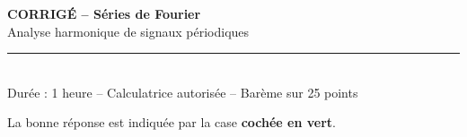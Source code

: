 \documentclass[a4paper,11pt]{article}
\begin{document}
\begin{center}
  {\LARGE \textbf{\textcolor{red!70!black}{CORRIGÉ} -- Séries de Fourier}} \\[0.2cm]
  {\Large Analyse harmonique de signaux périodiques} \\[0.2cm]
  \rule{0.6\textwidth}{0.4pt} \\[0.2cm]
  {\normalsize Durée : 1 heure \quad -- \quad Calculatrice autorisée \quad -- \quad Barème sur 25 points}
\end{center}

\vspace{0.4cm}

\begin{tcolorbox}[qcmbox={Exercice 1 \,--\, QCM \hfill \normalfont\textit{(5 points)}}]
  La bonne réponse est indiquée par la case \textbf{cochée en vert}.
\end{tcolorbox}

\vspace{0.3cm}
\end{document}
